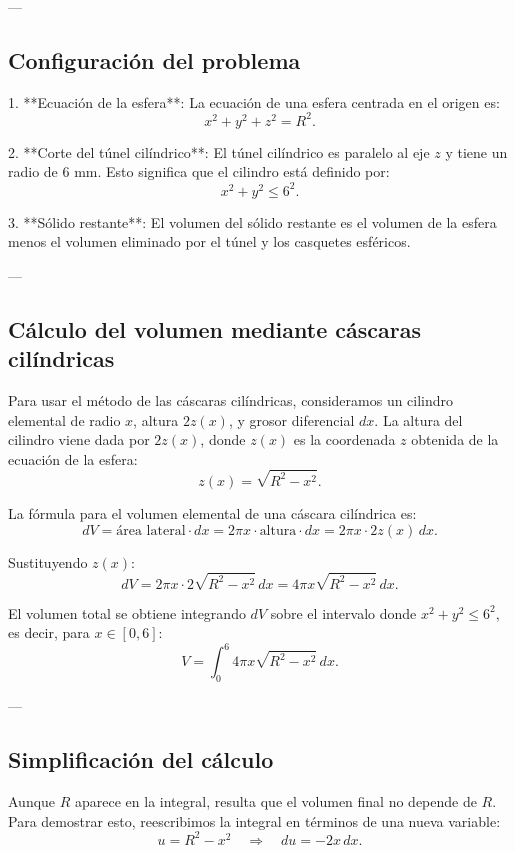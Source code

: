 \documentclass[11pt,letterpaper]{article}
\begin{document}
---

\subsection*{Configuración del problema}

1. **Ecuación de la esfera**: 
 La ecuación de una esfera centrada en el origen es:
 \[
 x^2 + y^2 + z^2 = R^2.
 \]

2. **Corte del túnel cilíndrico**: 
 El túnel cilíndrico es paralelo al eje \(z\) y tiene un radio de 6 mm. Esto significa que el cilindro está definido por:
 \[
 x^2 + y^2 \leq 6^2.
 \]

3. **Sólido restante**: 
 El volumen del sólido restante es el volumen de la esfera menos el volumen eliminado por el túnel y los casquetes esféricos.

---

\subsection*{Cálculo del volumen mediante cáscaras cilíndricas}

Para usar el método de las cáscaras cilíndricas, consideramos un cilindro elemental de radio \(x\), altura \(2z(x)\), y grosor diferencial \(dx\). La altura del cilindro viene dada por \(2z(x)\), donde \(z(x)\) es la coordenada \(z\) obtenida de la ecuación de la esfera:
\[
z(x) = \sqrt{R^2 - x^2}.
\]

La fórmula para el volumen elemental de una cáscara cilíndrica es:
\[
dV = \text{área lateral} \cdot dx = 2\pi x \cdot \text{altura} \cdot dx = 2\pi x \cdot 2z(x) \, dx.
\]

Sustituyendo \(z(x)\):
\[
dV = 2\pi x \cdot 2\sqrt{R^2 - x^2} \, dx = 4\pi x \sqrt{R^2 - x^2} \, dx.
\]

El volumen total se obtiene integrando \(dV\) sobre el intervalo donde \(x^2 + y^2 \leq 6^2\), es decir, para \(x \in [0, 6]\):
\[
V = \int_{0}^{6} 4\pi x \sqrt{R^2 - x^2} \, dx.
\]

---

\subsection*{Simplificación del cálculo}

Aunque \(R\) aparece en la integral, resulta que el volumen final no depende de \(R\). Para demostrar esto, reescribimos la integral en términos de una nueva variable:
\[
u = R^2 - x^2 \quad \Rightarrow \quad du = -2x \, dx.
\]
\end{document}
